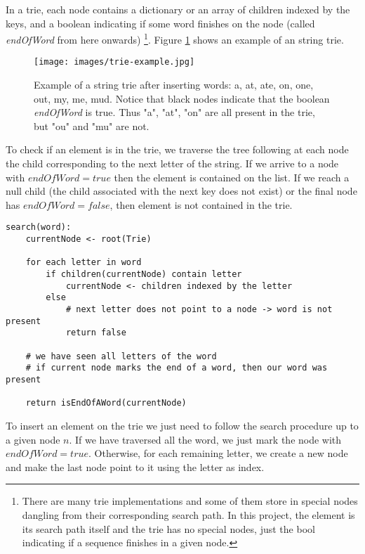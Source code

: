\documentclass[a4paper,10pt,table,xcdraw]{article}
\begin{document}
In a trie, each node contains a dictionary or an array of children indexed by the keys, and a boolean indicating if some word finishes on the node (called \textit{endOfWord} from here onwards) \footnote{ There are many trie implementations and some of them store in special nodes dangling from their corresponding search path. In this project, the element is its search path itself and the trie has no special nodes, just the bool indicating if a sequence finishes in a given node.}. Figure \ref{fig:trie-example} shows an example of an string trie.

\begin{figure}[H]
\centering
\texttt{[image: images/trie-example.jpg]}
\caption{Example of a string trie after inserting words: a, at, ate, on, one, out, my, me, mud. Notice that black nodes indicate that the boolean \textit{endOfWord} is true. Thus "a", "at", "on" are all present in the trie, but "ou" and "mu" are not.}
\label{fig:trie-example}
\end{figure}


To check if an element is in the trie, we traverse the tree following at each node the child corresponding to the next letter of the string. If we arrive to a node with $endOfWord=true$ then the element is contained on the list. If we reach a null child (the child associated with the next key does not exist) or the final node has $endOfWord=false$, then element is not contained in the trie.

\begin{verbatim}
search(word):
    currentNode <- root(Trie)
    
    for each letter in word
        if children(currentNode) contain letter
            currentNode <- children indexed by the letter
        else
            # next letter does not point to a node -> word is not present
            return false    
    
    # we have seen all letters of the word
    # if current node marks the end of a word, then our word was present
    
    return isEndOfAWord(currentNode)

\end{verbatim}


To insert an element on the trie we just need to follow the search procedure up to a given node $n$. If we have traversed all the word, we just mark the node with $endOfWord=true$. Otherwise, for each remaining letter, we create a new node and make the last node point to it using the letter as index.
\end{document}
